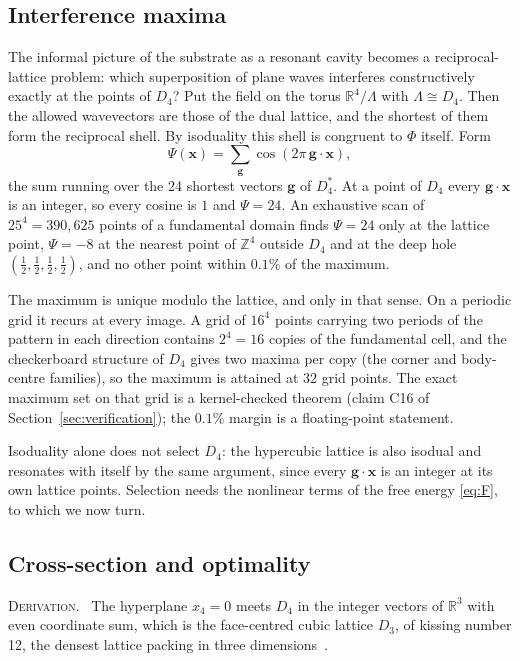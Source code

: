 \documentclass[a4paper,11pt]{article}
\makeatletter
\numberwithin{equation}{section}
\theoremstyle{jsplain}
\theoremstyle{jsrem}
\newcommand{\lbl}[1]{\textcolor{lbl@#1}{\textsc{#1}}.\ }
\makeatother
\begin{document}
\subsection{Interference maxima}

The informal picture of the substrate as a resonant cavity becomes a reciprocal-lattice problem: which superposition of plane waves interferes constructively exactly at the points of $D_4$? Put the field on the torus $\mathbb{R}^4/\Lambda$ with $\Lambda\cong D_4$. Then the allowed wavevectors are those of the dual lattice, and the shortest of them form the reciprocal shell. By isoduality this shell is congruent to $\Phi$ itself. Form
\begin{equation}\label{eq:Psi}
\Psi(\mathbf{x})=\sum_{\mathbf{g}}\cos(2\pi\,\mathbf{g}\cdot\mathbf{x}),
\end{equation}
the sum running over the 24 shortest vectors $\mathbf{g}$ of $D_4^*$. At a point of $D_4$ every $\mathbf{g}\cdot\mathbf{x}$ is an integer, so every cosine is $1$ and $\Psi=24$. An exhaustive scan of $25^4=390{,}625$ points of a fundamental domain finds $\Psi=24$ only at the lattice point, $\Psi=-8$ at the nearest point of $\mathbb{Z}^4$ outside $D_4$ and at the deep hole $(\tfrac12,\tfrac12,\tfrac12,\tfrac12)$, and no other point within $0.1\%$ of the maximum.

The maximum is unique modulo the lattice, and only in that sense. On a periodic grid it recurs at every image. A grid of $16^4$ points carrying two periods of the pattern in each direction contains $2^4=16$ copies of the fundamental cell, and the checkerboard structure of $D_4$ gives two maxima per copy (the corner and body-centre families), so the maximum is attained at $32$ grid points. The exact maximum set on that grid is a kernel-checked theorem (claim C16 of Section~\ref{sec:verification}); the $0.1\%$ margin is a floating-point statement.

Isoduality alone does not select $D_4$: the hypercubic lattice is also isodual and resonates with itself by the same argument, since every $\mathbf{g}\cdot\mathbf{x}$ is an integer at its own lattice points. Selection needs the nonlinear terms of the free energy \eqref{eq:F}, to which we now turn.

\subsection{Cross-section and optimality}

\lbl{Derivation} The hyperplane $x_4=0$ meets $D_4$ in the integer vectors of $\mathbb{R}^3$ with even coordinate sum, which is the face-centred cubic lattice $D_3$, of kissing number 12, the densest lattice packing in three dimensions~\cite{ref6}.
\end{document}
